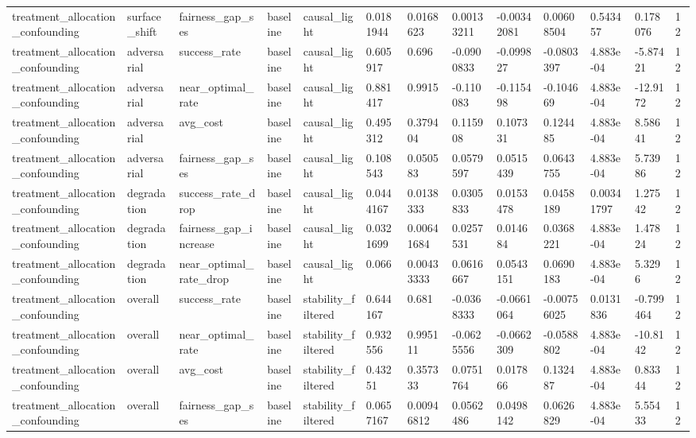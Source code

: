 \begin{tabular}{lllllllllllll}
treatment\_allocation\_confounding & surface\_shift & fairness\_gap\_ses & baseline & causal\_light & 0.0181944 & 0.0168623 & 0.00133211 & -0.00342081 & 0.00608504 & 0.543457 & 0.178076 & 12 \\
treatment\_allocation\_confounding & adversarial & success\_rate & baseline & causal\_light & 0.605917 & 0.696 & -0.0900833 & -0.099827 & -0.0803397 & 4.883e-04 & -5.87421 & 12 \\
treatment\_allocation\_confounding & adversarial & near\_optimal\_rate & baseline & causal\_light & 0.881417 & 0.9915 & -0.110083 & -0.115498 & -0.104669 & 4.883e-04 & -12.9172 & 12 \\
treatment\_allocation\_confounding & adversarial & avg\_cost & baseline & causal\_light & 0.495312 & 0.379404 & 0.115908 & 0.107331 & 0.124485 & 4.883e-04 & 8.58641 & 12 \\
treatment\_allocation\_confounding & adversarial & fairness\_gap\_ses & baseline & causal\_light & 0.108543 & 0.050583 & 0.0579597 & 0.0515439 & 0.0643755 & 4.883e-04 & 5.73986 & 12 \\
treatment\_allocation\_confounding & degradation & success\_rate\_drop & baseline & causal\_light & 0.0444167 & 0.0138333 & 0.0305833 & 0.0153478 & 0.0458189 & 0.00341797 & 1.27542 & 12 \\
treatment\_allocation\_confounding & degradation & fairness\_gap\_increase & baseline & causal\_light & 0.0321699 & 0.00641684 & 0.0257531 & 0.014684 & 0.0368221 & 4.883e-04 & 1.47824 & 12 \\
treatment\_allocation\_confounding & degradation & near\_optimal\_rate\_drop & baseline & causal\_light & 0.066 & 0.00433333 & 0.0616667 & 0.0543151 & 0.0690183 & 4.883e-04 & 5.3296 & 12 \\
treatment\_allocation\_confounding & overall & success\_rate & baseline & stability\_filtered & 0.644167 & 0.681 & -0.0368333 & -0.0661064 & -0.00756025 & 0.0131836 & -0.799464 & 12 \\
treatment\_allocation\_confounding & overall & near\_optimal\_rate & baseline & stability\_filtered & 0.932556 & 0.995111 & -0.0625556 & -0.0662309 & -0.0588802 & 4.883e-04 & -10.8142 & 12 \\
treatment\_allocation\_confounding & overall & avg\_cost & baseline & stability\_filtered & 0.43251 & 0.357333 & 0.0751764 & 0.017866 & 0.132487 & 4.883e-04 & 0.83344 & 12 \\
treatment\_allocation\_confounding & overall & fairness\_gap\_ses & baseline & stability\_filtered & 0.0657167 & 0.00946812 & 0.0562486 & 0.0498142 & 0.0626829 & 4.883e-04 & 5.55433 & 12 \\

\end{tabular}
